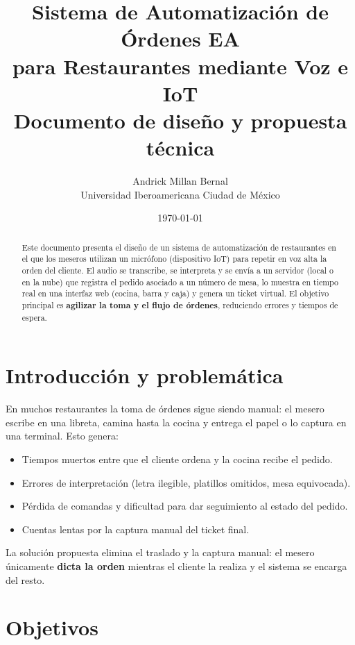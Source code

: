 \documentclass[11pt,letterpaper]{article}
\title{\textbf{\color{azulprincipal}Sistema de Automatización de Órdenes EA\\para Restaurantes mediante Voz e IoT}\\[0.4em]
\large Documento de diseño y propuesta técnica}
\author{Andrick Millan Bernal\\ \small Universidad Iberoamericana Ciudad de México}
\date{\today}
\begin{document}
\maketitle
\thispagestyle{fancy}

\begin{abstract}
Este documento presenta el diseño de un sistema de automatización de restaurantes en el que los meseros utilizan un micrófono (dispositivo IoT) para repetir en voz alta la orden del cliente. El audio se transcribe, se interpreta y se envía a un servidor (local o en la nube) que registra el pedido asociado a un número de mesa, lo muestra en tiempo real en una interfaz web (cocina, barra y caja) y genera un ticket virtual. El objetivo principal es \textbf{agilizar la toma y el flujo de órdenes}, reduciendo errores y tiempos de espera.
\end{abstract}

\tableofcontents
\newpage

\section{Introducción y problemática}
En muchos restaurantes la toma de órdenes sigue siendo manual: el mesero escribe en una libreta, camina hasta la cocina y entrega el papel o lo captura en una terminal. Esto genera:

\begin{itemize}[noitemsep]
  \item Tiempos muertos entre que el cliente ordena y la cocina recibe el pedido.
  \item Errores de interpretación (letra ilegible, platillos omitidos, mesa equivocada).
  \item Pérdida de comandas y dificultad para dar seguimiento al estado del pedido.
  \item Cuentas lentas por la captura manual del ticket final.
\end{itemize}

La solución propuesta elimina el traslado y la captura manual: el mesero únicamente \textbf{dicta la orden} mientras el cliente la realiza y el sistema se encarga del resto.

\section{Objetivos}
\end{document}
